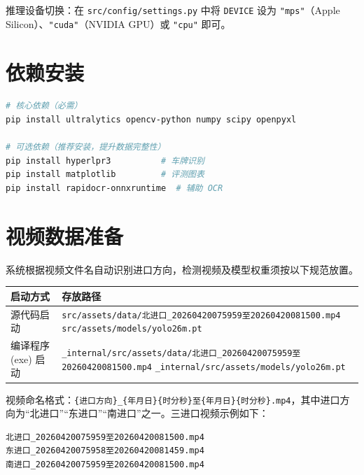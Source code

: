 \documentclass[12pt,a4paper]{ctexart}
\begin{document}
推理设备切换：在 \texttt{src/config/settings.py} 中将 \texttt{DEVICE} 设为 \texttt{"mps"}（Apple Silicon）、\texttt{"cuda"}（NVIDIA GPU）或 \texttt{"cpu"} 即可。

\section{依赖安装}

\begin{lstlisting}[language=bash]
# 核心依赖（必需）
pip install ultralytics opencv-python numpy scipy openpyxl

# 可选依赖（推荐安装，提升数据完整性）
pip install hyperlpr3          # 车牌识别
pip install matplotlib         # 评测图表
pip install rapidocr-onnxruntime  # 辅助 OCR
\end{lstlisting}

\section{视频数据准备}

系统根据视频文件名自动识别进口方向，检测视频及模型权重须按以下规范放置。

\begin{table}[htbp]
    \centering
    \begin{tabularx}{\textwidth}{@{}p{3.2cm}L@{}}
        \toprule
        \textbf{启动方式} & \textbf{存放路径} \\
        \midrule
        源代码启动 &
        \texttt{src/assets/data/北进口\_20260420075959至20260420081500.mp4}\newline
        \texttt{src/assets/models/yolo26m.pt} \\
        \midrule
        编译程序 (exe) 启动 &
        \texttt{\_internal/src/assets/data/北进口\_20260420075959至20260420081500.mp4}\newline
        \texttt{\_internal/src/assets/models/yolo26m.pt} \\
        \bottomrule
    \end{tabularx}
\end{table}

视频命名格式：\texttt{\{进口方向\}\_\{年月日\}\{时分秒\}至\{年月日\}\{时分秒\}.mp4}，其中进口方向为“北进口”“东进口”“南进口”之一。三进口视频示例如下：

\begin{lstlisting}[language=bash]
北进口_20260420075959至20260420081500.mp4
东进口_20260420075958至20260420081459.mp4
南进口_20260420075959至20260420081500.mp4
\end{lstlisting}
\end{document}
